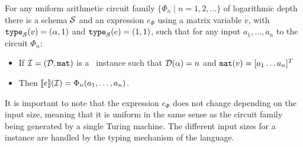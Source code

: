 
\begin{theorem}
\label{th-circuits-ml}
For any uniform arithmetic circuit family $\{\Phi_n\mid n=1,2,\ldots\}$ of logarithmic depth there is a \langfor schema $\mathcal{S}$ and an expression $e_\Phi$ using a matrix variable $v$, with $\texttt{type}_{\mathcal{S}}(v)=(\alpha,1)$ and $\texttt{type}_{\mathcal{S}}(e) = (1,1)$, such that for any input $a_1,\ldots ,a_n$ to the circuit $\Phi_n$:
\begin{itemize}
\item If $\mathcal{I} = (\mathcal{D},\texttt{mat})$ is a \lang\ instance such that $\mathcal{D}(\alpha) = n$ and $\texttt{mat}(v) = [a_1 \ldots a_n]^T$
\item Then $\llbracket e \rrbracket(\mathcal{I}) = \Phi_n(a_1,\ldots ,a_n)$.
\end{itemize}
\end{theorem}
It is important to note that the expression $e_\Phi$ does not change depending on the input size, meaning that it is uniform in the same sense as the circuit family being generated by a single Turing machine. The different input sizes for a \langfor instance are handled by the typing mechanism of the language. 

